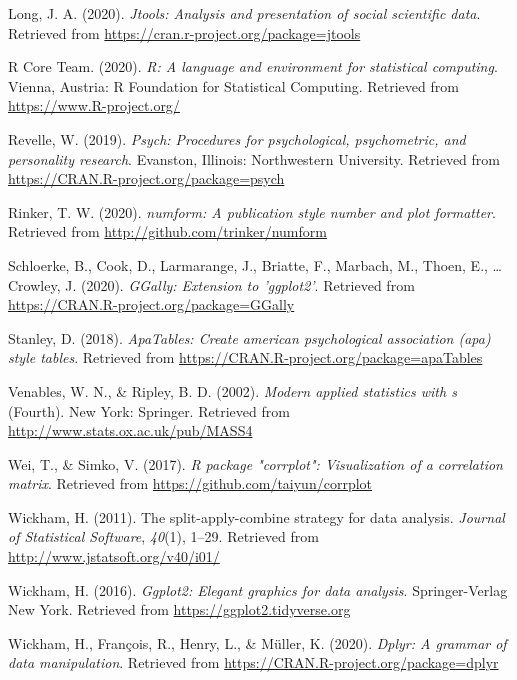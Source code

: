 \documentclass[
  english,
  man,floatsintext]{apa6}
\begin{document}
\leavevmode\hypertarget{ref-R-jtools}{}%
Long, J. A. (2020). \emph{Jtools: Analysis and presentation of social scientific data}. Retrieved from \url{https://cran.r-project.org/package=jtools}

\leavevmode\hypertarget{ref-R-base}{}%
R Core Team. (2020). \emph{R: A language and environment for statistical computing}. Vienna, Austria: R Foundation for Statistical Computing. Retrieved from \url{https://www.R-project.org/}

\leavevmode\hypertarget{ref-R-psych}{}%
Revelle, W. (2019). \emph{Psych: Procedures for psychological, psychometric, and personality research}. Evanston, Illinois: Northwestern University. Retrieved from \url{https://CRAN.R-project.org/package=psych}

\leavevmode\hypertarget{ref-R-numform}{}%
Rinker, T. W. (2020). \emph{numform: A publication style number and plot formatter}. Retrieved from \url{http://github.com/trinker/numform}

\leavevmode\hypertarget{ref-R-GGally}{}%
Schloerke, B., Cook, D., Larmarange, J., Briatte, F., Marbach, M., Thoen, E., \ldots{} Crowley, J. (2020). \emph{GGally: Extension to 'ggplot2'}. Retrieved from \url{https://CRAN.R-project.org/package=GGally}

\leavevmode\hypertarget{ref-R-apaTables}{}%
Stanley, D. (2018). \emph{ApaTables: Create american psychological association (apa) style tables}. Retrieved from \url{https://CRAN.R-project.org/package=apaTables}

\leavevmode\hypertarget{ref-R-MASS}{}%
Venables, W. N., \& Ripley, B. D. (2002). \emph{Modern applied statistics with s} (Fourth). New York: Springer. Retrieved from \url{http://www.stats.ox.ac.uk/pub/MASS4}

\leavevmode\hypertarget{ref-R-corrplot2017}{}%
Wei, T., \& Simko, V. (2017). \emph{R package "corrplot": Visualization of a correlation matrix}. Retrieved from \url{https://github.com/taiyun/corrplot}

\leavevmode\hypertarget{ref-R-plyr}{}%
Wickham, H. (2011). The split-apply-combine strategy for data analysis. \emph{Journal of Statistical Software}, \emph{40}(1), 1--29. Retrieved from \url{http://www.jstatsoft.org/v40/i01/}

\leavevmode\hypertarget{ref-R-ggplot2}{}%
Wickham, H. (2016). \emph{Ggplot2: Elegant graphics for data analysis}. Springer-Verlag New York. Retrieved from \url{https://ggplot2.tidyverse.org}

\leavevmode\hypertarget{ref-R-dplyr}{}%
Wickham, H., François, R., Henry, L., \& Müller, K. (2020). \emph{Dplyr: A grammar of data manipulation}. Retrieved from \url{https://CRAN.R-project.org/package=dplyr}

\endgroup
\end{document}
